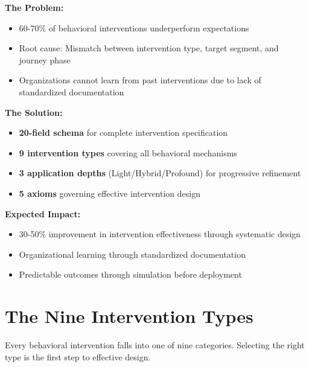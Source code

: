 \documentclass[11pt,a4paper]{article}
\begin{document}
\textbf{The Problem:}
\begin{itemize}[nosep]
\item 60-70\% of behavioral interventions underperform expectations
\item Root cause: Mismatch between intervention type, target segment, and journey phase
\item Organizations cannot learn from past interventions due to lack of standardized documentation
\end{itemize}

\textbf{The Solution:}
\begin{itemize}[nosep]
\item \textbf{20-field schema} for complete intervention specification
\item \textbf{9 intervention types} covering all behavioral mechanisms
\item \textbf{3 application depths} (Light/Hybrid/Profound) for progressive refinement
\item \textbf{5 axioms} governing effective intervention design
\end{itemize}

\textbf{Expected Impact:}
\begin{itemize}[nosep]
\item 30-50\% improvement in intervention effectiveness through systematic design
\item Organizational learning through standardized documentation
\item Predictable outcomes through simulation before deployment
\end{itemize}

\newpage
\section{The Nine Intervention Types}

Every behavioral intervention falls into one of nine categories. Selecting the right type is the first step to effective design.
\end{document}
